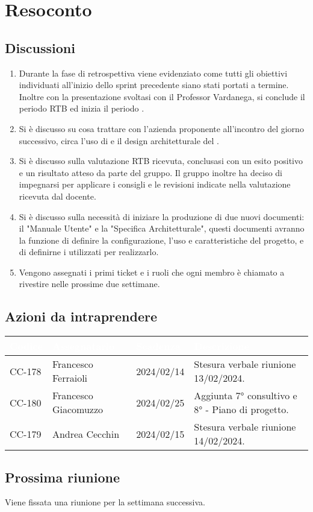 \section{Resoconto} \label{sec:resoconto}
\subsection{Discussioni} \label{subsec:resdiscussione}
\begin{enumerate}
    \item Durante la fase di retrospettiva viene evidenziato come tutti gli obiettivi individuati all'inizio dello sprint precedente siano stati portati a termine. Inoltre con la presentazione svoltasi con il Professor Vardanega, si conclude il periodo RTB ed inizia il periodo .
    \item Si è discusso su cosa trattare con l'azienda proponente all'incontro del giorno successivo, circa l'uso di  e il design architetturale del .
    \item Si è discusso sulla valutazione RTB ricevuta, conclusasi con un esito positivo e un risultato atteso da parte del gruppo. Il gruppo inoltre ha deciso di impegnarsi per applicare i consigli e le revisioni indicate nella valutazione ricevuta dal docente.
    \item Si è discusso sulla necessità di iniziare la produzione di due nuovi documenti: il "Manuale Utente" e la "Specifica Architetturale", questi documenti avranno la funzione di definire la configurazione, l'uso e caratteristiche del progetto, e di definirne i  utilizzati per realizzarlo.
    \item Vengono assegnati i primi ticket e i ruoli che ogni membro è chiamato a rivestire nelle prossime due settimane.
\end{enumerate}

\subsection{Azioni da intraprendere}
{
    \setlength{\tabcolsep}{10pt}
            \renewcommand{\arraystretch}{1.5}
            \begin{xltabular}{\textwidth}{| l | l | l | X |}
                 \hline
                 \textbf{\textcolor{white}{Codice }} & \textbf{\textcolor{white}{Assegnatario}} & \textbf{\textcolor{white}{Scadenza}} & \textbf{\textcolor{white}{Descrizione}} \\
                 \hline
                 CC-178 & Francesco Ferraioli & 2024/02/14 & Stesura verbale riunione 13/02/2024.\\
                 \hline
                 CC-180 & Francesco Giacomuzzo & 2024/02/25 & Aggiunta 7° consultivo e 8°  - Piano di progetto.\\
                 \hline
                 CC-179 & Andrea Cecchin & 2024/02/15 & Stesura verbale riunione 14/02/2024.\\
                 \hline
                 
            \end{xltabular}
}

\subsection{Prossima riunione} \label{subsec:riunione}
Viene fissata una riunione per la settimana successiva.